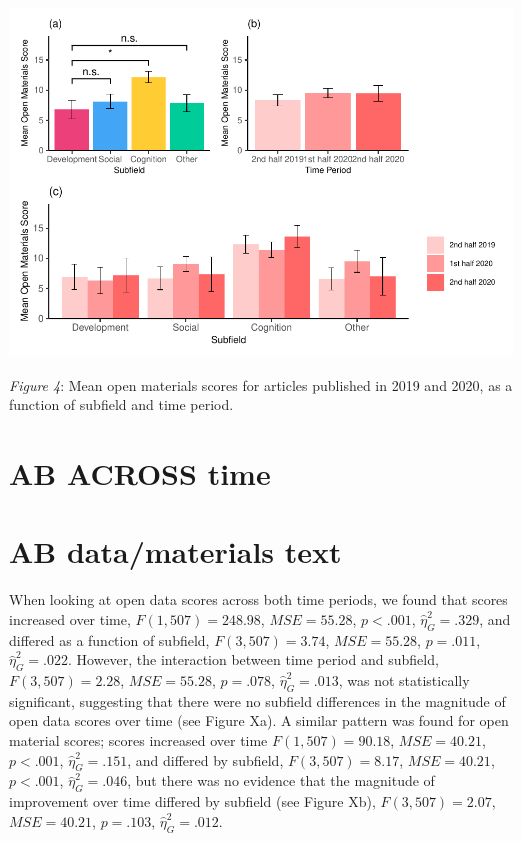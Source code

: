 \documentclass[
  english,
  man]{apa6}
\begin{document}
\includegraphics{icd_special_issue_files/figure-latex/1B-m-plots-1.pdf}

\emph{Figure 4}: Mean open materials scores for articles published in 2019 and 2020, as a function of subfield and time period.

\hypertarget{ab-across-time}{%
\section{AB ACROSS time}\label{ab-across-time}}

\hypertarget{ab-datamaterials-text}{%
\section{AB data/materials text}\label{ab-datamaterials-text}}

When looking at open data scores across both time periods, we found that scores increased over time, \(F(1, 507) = 248.98\), \(\mathit{MSE} = 55.28\), \(p < .001\), \(\hat{\eta}^2_G = .329\), and differed as a function of subfield, \(F(3, 507) = 3.74\), \(\mathit{MSE} = 55.28\), \(p = .011\), \(\hat{\eta}^2_G = .022\). However, the interaction between time period and subfield, \(F(3, 507) = 2.28\), \(\mathit{MSE} = 55.28\), \(p = .078\), \(\hat{\eta}^2_G = .013\), was not statistically significant, suggesting that there were no subfield differences in the magnitude of open data scores over time (see Figure Xa). A similar pattern was found for open material scores; scores increased over time \(F(1, 507) = 90.18\), \(\mathit{MSE} = 40.21\), \(p < .001\), \(\hat{\eta}^2_G = .151\), and differed by subfield, \(F(3, 507) = 8.17\), \(\mathit{MSE} = 40.21\), \(p < .001\), \(\hat{\eta}^2_G = .046\), but there was no evidence that the magnitude of improvement over time differed by subfield (see Figure Xb), \(F(3, 507) = 2.07\), \(\mathit{MSE} = 40.21\), \(p = .103\), \(\hat{\eta}^2_G = .012\).
\end{document}
